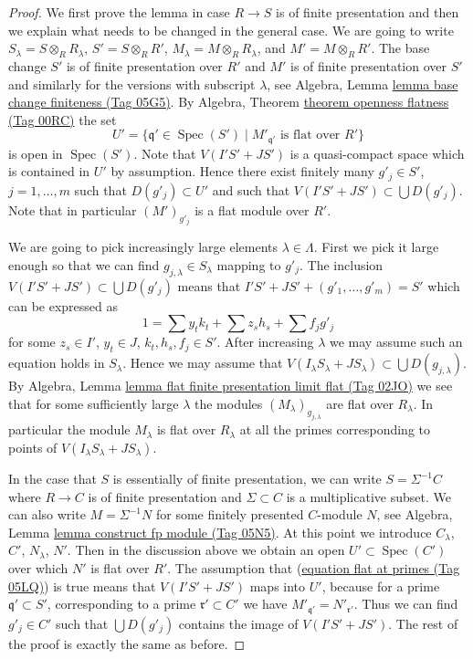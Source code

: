 \documentclass{amsart}
\theoremstyle{plain}
\theoremstyle{definition}
\theoremstyle{remark}
\numberwithin{equation}{subsection}
\def\Spec{\mathop{\mathrm{Spec}}}
\begin{document}
\begin{proof}
We first prove the lemma in case $R \to S$ is of finite presentation
and then we explain what needs to be changed in the general case.
We are going to write $S_\lambda = S \otimes_R R_\lambda$,
$S' = S \otimes_R R'$, $M_\lambda = M \otimes_R R_\lambda$, and
$M' = M \otimes_R R'$.
The base change $S'$ is of finite presentation over $R'$ and
$M'$ is of finite presentation over $S'$ and similarly for the
versions with subscript $\lambda$, see
Algebra, Lemma \href{https://stacks.math.columbia.edu/tag/05G5}{lemma base change finiteness (Tag 05G5)}.
By
Algebra, Theorem \href{https://stacks.math.columbia.edu/tag/00RC}{theorem openness flatness (Tag 00RC)}
the set
$$
U' = \{\mathfrak q' \in \Spec(S') \mid
M'_{\mathfrak q'}\text{ is flat over }R'\}
$$
is open in $\Spec(S')$. Note that $V(I'S' + JS')$
is a quasi-compact space which is contained in $U'$ by assumption.
Hence there exist finitely many $g'_j \in S'$, $j = 1, \ldots, m$
such that $D(g'_j) \subset U'$ and such
that $V(I'S' + JS') \subset \bigcup D(g'_j)$.
Note that in particular $(M')_{g'_j}$ is a flat module over $R'$.

\medskip\noindent
We are going to pick increasingly large elements $\lambda \in \Lambda$.
First we pick it large enough so that we can find
$g_{j, \lambda} \in S_{\lambda}$ mapping to $g'_j$.
The inclusion $V(I'S' + JS') \subset \bigcup D(g'_j)$ means that
$I'S' + JS' + (g'_1, \ldots, g'_m) = S'$ which can be expressed as
$$
1 = \sum y_tk_t + \sum z_sh_s + \sum f_jg'_j
$$
for some $z_s \in I'$, $y_t \in J$, $k_t, h_s, f_j \in S'$.
After increasing $\lambda$ we may assume such an equation holds in
$S_\lambda$. Hence we may assume that
$V(I_\lambda S_\lambda + J S_\lambda) \subset \bigcup D(g_{j, \lambda})$. By
Algebra, Lemma \href{https://stacks.math.columbia.edu/tag/02JO}{lemma flat finite presentation limit flat (Tag 02JO)}
we see that for some sufficiently large $\lambda$ the modules
$(M_\lambda)_{g_{j, \lambda}}$ are flat over $R_\lambda$.
In particular the module $M_\lambda$ is flat over $R_\lambda$
at all the primes corresponding to points of
$V(I_\lambda S_\lambda + J S_\lambda)$.

\medskip\noindent
In the case that $S$ is essentially of finite presentation, we can write
$S = \Sigma^{-1}C$ where $R \to C$ is of finite presentation and
$\Sigma \subset C$ is a multiplicative subset. We can also write
$M = \Sigma^{-1}N$ for some finitely presented $C$-module $N$, see
Algebra, Lemma \href{https://stacks.math.columbia.edu/tag/05N5}{lemma construct fp module (Tag 05N5)}.
At this point we introduce $C_\lambda$, $C'$, $N_\lambda$, $N'$. Then in
the discussion above we obtain an open $U' \subset \Spec(C')$
over which $N'$ is flat over $R'$. The assumption that
(\href{https://stacks.math.columbia.edu/tag/05LQ}{equation flat at primes (Tag 05LQ)}) is true means that $V(I'S' + JS')$ maps
into $U'$, because for a prime $\mathfrak q' \subset S'$, corresponding
to a prime $\mathfrak r' \subset C'$ we have
$M'_{\mathfrak q'} = N'_{\mathfrak r'}$. Thus we can find
$g'_j \in C'$ such that $\bigcup D(g'_j)$ contains the image of
$V(I'S' + JS')$. The rest of the proof is exactly the same as before.
\end{proof}
\end{document}
